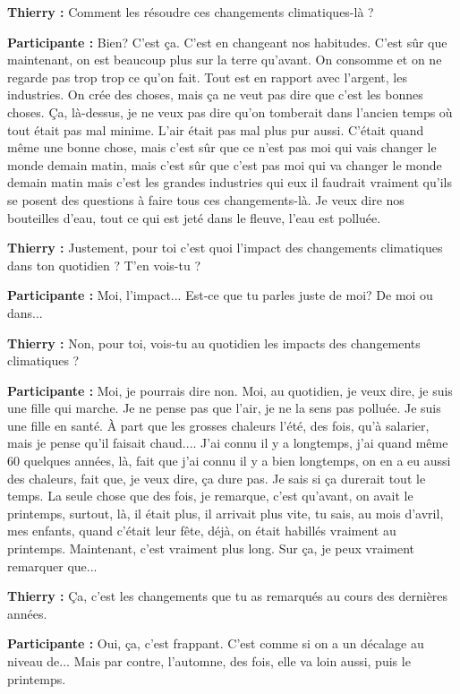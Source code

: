 \textbf{Thierry :} Comment les résoudre ces changements climatiques-là ?

\textbf{Participante :} Bien? C'est ça. C'est en changeant nos habitudes. C'est sûr que maintenant, on est beaucoup plus sur la terre qu'avant. On consomme et on ne regarde pas trop trop ce qu'on fait. Tout est en rapport avec l'argent, les industries. On crée des choses, mais ça ne veut pas dire que c'est les bonnes choses. Ça, là-dessus, je ne veux pas dire qu'on tomberait dans l'ancien temps où tout était pas mal minime. L'air était pas mal plus pur aussi. C'était quand même une bonne chose, mais c'est sûr que ce n'est pas moi qui vais changer le monde demain matin, mais c'est sûr que c'est pas moi qui va changer le monde demain matin mais c'est les grandes industries qui eux il faudrait vraiment qu'ils se posent des questions à faire tous ces changements-là. Je veux dire nos bouteilles d'eau, tout ce qui est jeté dans le fleuve, l'eau est polluée.

\textbf{Thierry :} Justement, pour toi c'est quoi l'impact des changements climatiques dans ton quotidien ? T'en vois-tu ?

\textbf{Participante :} Moi, l'impact... Est-ce que tu parles juste de moi? De moi ou dans... 

\textbf{Thierry :} Non, pour toi, vois-tu au quotidien les impacts des changements climatiques ?

\textbf{Participante :} Moi, je pourrais dire non. Moi, au quotidien, je veux dire, je suis une fille qui marche. Je ne pense pas que l'air, je ne la sens pas polluée. Je suis une fille en santé. À part que les grosses chaleurs l'été, des fois, qu'à salarier, mais je pense qu'il faisait chaud.... J'ai connu il y a longtemps, j'ai quand même 60 quelques années, là, fait que j'ai connu il y a bien longtemps, on en a eu aussi des chaleurs, fait que, je veux dire, ça dure pas. Je sais si ça durerait tout le temps. La seule chose que des fois, je remarque, c'est qu'avant, on avait le printemps, surtout, là, il était plus, il arrivait plus vite, tu sais, au mois d'avril, mes enfants, quand c'était leur fête, déjà, on était habillés vraiment au printemps. Maintenant, c'est vraiment plus long. Sur ça, je peux vraiment remarquer que... 

\textbf{Thierry :} Ça, c'est les changements que tu as remarqués au cours des dernières années.

\textbf{Participante :} Oui, ça, c'est frappant. C'est comme si on a un décalage au niveau de... Mais par contre, l'automne, des fois, elle va loin aussi, puis le printemps.

